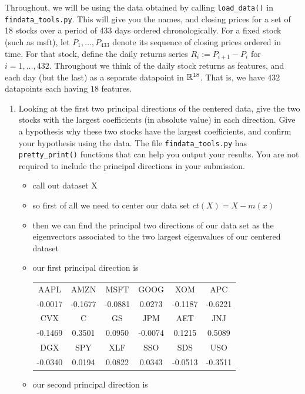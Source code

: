 \documentclass[12pt,twoside]{article}
\begin{document}
\begin{enumerate}
  Throughout, we will be using the data obtained by calling
 \verb|load_data()| in \verb|findata_tools.py|.  This will
  give you the names, and closing prices for a set of 18 stocks over a
  period of 433 days ordered chronologically.
  For a fixed stock (such as msft), let
  $P_1,\ldots,P_{433}$ denote its sequence of closing prices ordered in
  time.  For that stock, define the daily returns series $R_i:=P_{i+1}-P_i$ for
  $i=1,\ldots,432$.  Throughout we think of the daily stock returns as features,
  and each day (but the last) as a separate datapoint in $\mathbb{R}^{18}$.
  That is, we have $432$ datapoints each having $18$ features.
  \begin{enumerate}
  \item Looking at the first two principal directions of the
    centered data, give the two stocks with the largest
    coefficients (in absolute value) in each direction.  
    Give a hypothesis why these two stocks have the largest
    coefficients, and confirm your hypothesis using the data.  The file 
 \verb|findata_tools.py| has \verb|pretty_print()|
    functions that can help you output your results.
    You are not required to include the principal directions in
    your submission.
\begin{itemize}
  \color{blue}
  \item call out dataset X
  \item so first of all we need to center our data set $ct(X)=X-m(x)$
  \item then we can find the principal two directions of our data set as the eigenvectors associated to the two largest eigenvalues of our centered dataset 
  \item our first principal direction is  \begin{center}
    \begin{tabular}{c|c|c|c|c|c}
    AAPL & AMZN & MSFT & GOOG & XOM & APC\\
    -0.0017 & -0.1677 & -0.0881 & 0.0273 & -0.1187 & -0.6221\\
    \hline
    CVX & C & GS & JPM & AET & JNJ\\
    -0.1469 & 0.3501 & 0.0950 & -0.0074 & 0.1215 & 0.5089\\
    \hline
    DGX & SPY & XLF & SSO & SDS & USO\\
    -0.0340 & 0.0194 & 0.0822 & 0.0343 & -0.0513 & -0.3511\\
    \end{tabular}
    \end{center}
  \item our second principal direction is \begin{center}

\end{center}
\end{itemize}
\end{enumerate}
\end{enumerate}
\end{document}
